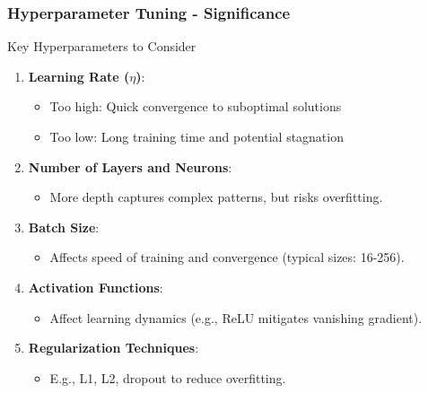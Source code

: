 \documentclass[aspectratio=169]{beamer}
\begin{document}
\begin{frame}
  \frametitle{Hyperparameter Tuning - Significance}
  \begin{block}{Key Hyperparameters to Consider}
    \begin{enumerate}
      \item \textbf{Learning Rate ($\eta$)}:
        \begin{itemize}
          \item Too high: Quick convergence to suboptimal solutions
          \item Too low: Long training time and potential stagnation
        \end{itemize}
      \item \textbf{Number of Layers and Neurons}:
        \begin{itemize}
          \item More depth captures complex patterns, but risks overfitting.
        \end{itemize}
      \item \textbf{Batch Size}:
        \begin{itemize}
          \item Affects speed of training and convergence (typical sizes: 16-256).
        \end{itemize}
      \item \textbf{Activation Functions}:
        \begin{itemize}
          \item Affect learning dynamics (e.g., ReLU mitigates vanishing gradient).
        \end{itemize}
      \item \textbf{Regularization Techniques}:
        \begin{itemize}
          \item E.g., L1, L2, dropout to reduce overfitting.
        \end{itemize}
    \end{enumerate}
  \end{block}
\end{frame}
\end{document}

